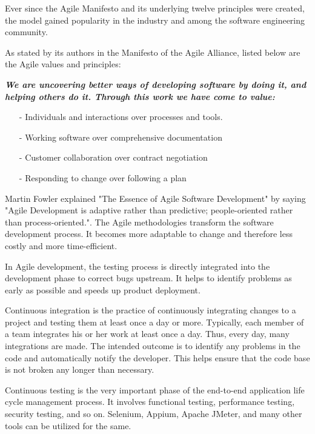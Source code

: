     Ever since the Agile Manifesto and its underlying twelve principles were created, the model gained popularity in the industry and among the software engineering community. 

As stated by its authors in the Manifesto of the Agile Alliance, listed below are the Agile values and principles:

 \textbf{\textit{We are uncovering better ways of developing software by doing it, and helping others do it. Through this work we have come to value:}} 
   \begin{itemize}
    \item[-] Individuals and interactions over processes and tools.
    \item[-] Working software over comprehensive documentation
    \item[-] Customer collaboration over contract negotiation
    \item[-] Responding to change over following a plan
   \end{itemize}
    
    Martin Fowler explained "The Essence of Agile Software Development" by saying "Agile Development is adaptive rather than predictive; people-oriented rather than process-oriented.".
    The Agile methodologies transform the software development process. It becomes more adaptable to change and therefore less costly and more time-efficient.
    
    In Agile development, the testing process is directly integrated into the development phase to correct bugs upstream. It helps to identify problems as early as possible and speeds up product deployment\cite{stolberg_enabling_2009}. 
    
    Continuous integration is the practice of continuously integrating changes to a project and testing them at least once a day or more. Typically, each member of a team integrates his or her work at least once a day. Thus, every day, many integrations are made.
    The intended outcome is to identify any problems in the code and automatically notify the developer. This helps ensure that the code base is not broken any longer than necessary\cite{stolberg_enabling_2009}.
    
    Continuous testing is the very important phase of the end-to-end application life cycle management process. It involves functional testing, performance testing, security testing, and so on. Selenium, Appium, Apache JMeter, and many other tools can be utilized for the same.
    
